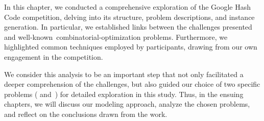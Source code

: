 In this chapter, we conducted a comprehensive exploration of the Google Hash
Code competition, delving into its structure, problem descriptions, and instance
generation. In particular, we established links between the challenges presented
and well-known~\acrshort{combinatorial-optimization} problems. Furthermore, we
highlighted common techniques employed by participants, drawing from our own
engagement in the competition.

We consider this analysis to be an important step that not only facilitated
a deeper comprehension of the challenges, but also guided our choice of two
specific problems ( and~) for detailed
exploration in this study. Thus, in the ensuing chapters, we will discuss our
modeling approach, analyze the chosen problems, and reflect on the conclusions
drawn from the work.






